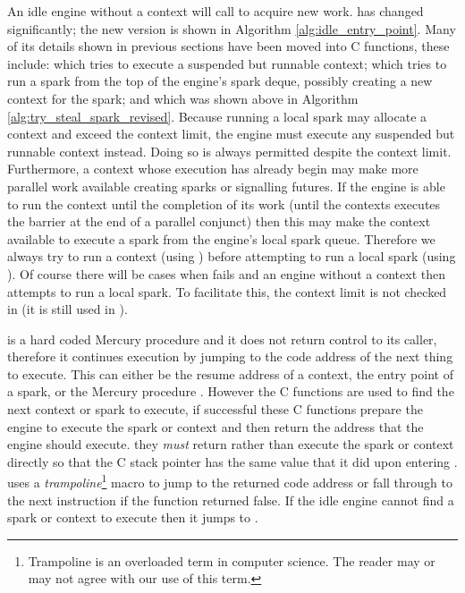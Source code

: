 An idle engine without a context will call \idle to acquire new work.
\idle has changed significantly;
the new version is shown in Algorithm \ref{alg:idle_entry_point}.
Many of its details shown in previous sections have been moved into C
functions,
these include:
\tryruncontext which tries to execute a suspended but runnable context;
\tryrunlocalspark which tries to run a spark from the top of the engine's
spark deque, possibly creating a new context for the spark;
and 
\trystealspark which was shown above in Algorithm
\ref{alg:try_steal_spark_revised}.
Because running a local spark may allocate a context and exceed the context
limit,
the engine must execute any suspended but runnable context instead.
Doing so is always permitted despite the context limit.
Furthermore,
a context whose execution has already begin may make more parallel work
available creating sparks or signalling futures.
If the engine is able to run the context until the completion of its work
(until the contexts executes the \joinandcontinue barrier at the end of a
parallel conjunct)
then this may make the context available to execute a spark from the
engine's local spark queue.
Therefore we always try to run a context (using \tryruncontext)
before attempting to run a local spark (using \tryrunlocalspark).
Of course there will be cases when \tryruncontext fails and an engine
without a context then attempts to run a local spark.
To facilitate this, the context limit is not checked in \tryrunlocalspark
(it is still used in \trystealspark).

\idle is a hard coded Mercury procedure and it does not return control to
its caller,
therefore it continues execution by jumping to the code address of the next
thing to execute.
This can either be the resume address of a context,
the entry point of a spark,
or the Mercury procedure \sleep.
However
the C functions are used to find the next context or spark to execute,
if successful these C functions prepare the engine to execute the spark or
context and then return the address that the engine should execute.
they \emph{must} return rather than execute the spark or context directly so
that the C stack pointer has the same value that it did upon entering \idle.
\idle uses a \emph{trampoline}\footnote{
    Trampoline is an overloaded term in computer science.
    The reader may or may not agree with our use of this term.
    }
macro to jump to the returned code
address or fall through to the next instruction if the function returned
false.
If the idle engine cannot find a spark or context to execute then it jumps
to \sleep.

